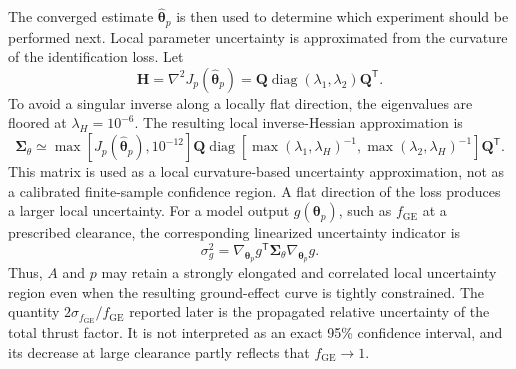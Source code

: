 \documentclass[journal]{IEEEtran}
\begin{document}
The converged estimate $\widehat{\boldsymbol{\theta}}_p$ is then used to determine which experiment should be performed next. Local parameter uncertainty is approximated from the curvature of the identification loss. Let
\begin{equation}
 \mathbf H=\nabla^2J_p(\widehat{\boldsymbol{\theta}}_p)
 =\mathbf Q\operatorname{diag}(\lambda_1,\lambda_2)\mathbf Q^{\mathsf T}.
\end{equation}
To avoid a singular inverse along a locally flat direction, the eigenvalues are floored at $\lambda_H=10^{-6}$. The resulting local inverse-Hessian approximation is
\begin{equation}
 \boldsymbol{\Sigma}_{\theta}\simeq
 \max\!\left[J_p(\widehat{\boldsymbol{\theta}}_p),10^{-12}\right]
 \mathbf Q\operatorname{diag}\!\left[
 \max(\lambda_1,\lambda_H)^{-1},
 \max(\lambda_2,\lambda_H)^{-1}
 \right]\mathbf Q^{\mathsf T}.
 \label{eq:parameter-covariance}
\end{equation}
This matrix is used as a local curvature-based uncertainty approximation, not as a calibrated finite-sample confidence region. A flat direction of the loss produces a larger local uncertainty. For a model output $g(\boldsymbol{\theta}_p)$, such as $f_{\mathrm{GE}}$ at a prescribed clearance, the corresponding linearized uncertainty indicator is
\begin{equation}
 \sigma_g^2=
 \nabla_{\boldsymbol{\theta}_p}g^{\mathsf T}
 \boldsymbol{\Sigma}_{\theta}
 \nabla_{\boldsymbol{\theta}_p}g.
 \label{eq:uncertainty-propagation}
\end{equation}
Thus, $A$ and $p$ may retain a strongly elongated and correlated local uncertainty region even when the resulting ground-effect curve is tightly constrained. The quantity $2\sigma_{f_{\mathrm{GE}}}/f_{\mathrm{GE}}$ reported later is the propagated relative uncertainty of the total thrust factor. It is not interpreted as an exact 95\% confidence interval, and its decrease at large clearance partly reflects that $f_{\mathrm{GE}}\rightarrow1$.
\end{document}
